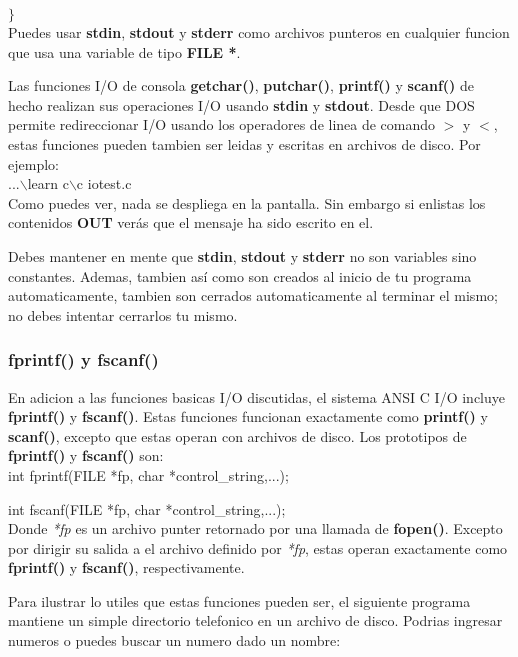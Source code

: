 \documentclass[]{article}
\begin{document}
	$\rbrace$\\
	
	Puedes usar \textbf{stdin}, \textbf{stdout} y \textbf{stderr} como archivos punteros en cualquier funcion que usa una variable de tipo \textbf{FILE *}.
	
	Las funciones I/O de consola \textbf{getchar()}, \textbf{putchar()}, \textbf{printf()} y \textbf{scanf()} de hecho realizan sus operaciones I/O usando \textbf{stdin} y \textbf{stdout}. Desde que DOS permite redireccionar I/O usando los operadores de linea de comando $>$ y $<$, estas funciones pueden tambien ser leidas y escritas en archivos de disco. Por ejemplo:\\
	
	...$\backslash$learn c$\backslash$c iotest.c\\
	
	Como puedes ver, nada se despliega en la pantalla. Sin embargo si enlistas los contenidos \textbf{OUT} verás que el mensaje ha sido escrito en el.
	
	Debes mantener en mente que \textbf{stdin}, \textbf{stdout} y \textbf{stderr} no son variables sino constantes. Ademas, tambien así como son creados al inicio de tu programa automaticamente, tambien son cerrados automaticamente al terminar el mismo; no debes intentar cerrarlos tu mismo.
	
	\subsubsection{fprintf() y fscanf()}
	
	En adicion a las funciones basicas I/O discutidas, el sistema ANSI C I/O incluye \textbf{fprintf()} y \textbf{fscanf()}. Estas funciones funcionan exactamente como \textbf{printf()} y \textbf{scanf()}, excepto que estas operan con archivos de disco. Los prototipos de \textbf{fprintf()} y \textbf{fscanf()} son:\\
	
	int fprintf(FILE *fp, char *control\_string,...);
	
	int fscanf(FILE *fp, char *control\_string,...);\\
	
	Donde \textit{*fp} es un archivo punter retornado por una llamada de \textbf{fopen()}. Excepto por dirigir su salida a el archivo definido por \textit{*fp}, estas operan exactamente como \textbf{fprintf()} y \textbf{fscanf()}, respectivamente.
	
	Para ilustrar lo utiles que estas funciones pueden ser, el siguiente programa mantiene un simple directorio telefonico en un archivo de disco. Podrias ingresar numeros o puedes buscar un numero dado un nombre:\\
	
\end{document}
